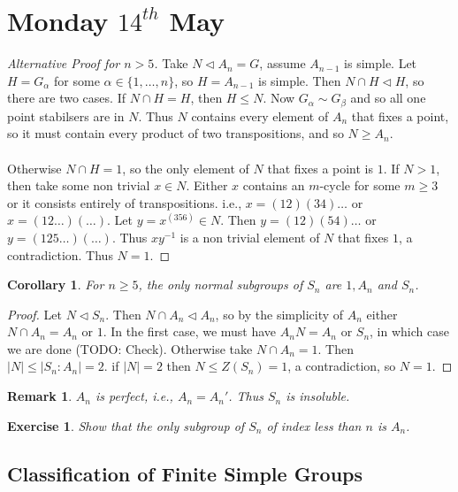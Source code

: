 \documentclass[a4paper,10pt]{article}
\newtheorem{Cor}[thm]{Corollary}
\newtheorem{Ex}[thm]{Exercise}
\newtheorem{rem}[thm]{Remark}
\begin{document}
\newpage
\section{Monday $14^{th}$ May}


\begin{proof}[Alternative Proof for $n > 5$]
Take $N \triangleleft A_n = G$, assume $A_{n-1}$ is simple. Let $H = G_\alpha$ for some $\alpha \in \{1, \dots, n\}$, so $H = A_{n-1}$ is simple. Then $N \cap H \triangleleft H$, so there are two cases. If $N \cap H = H$, then $H \leq N$. Now $G_\alpha \sim G_\beta$ and so all one point stabilsers are in $N$. Thus $N$ contains every element of $A_n$ that fixes a point, so it must contain every product of two transpositions, and so $N \geq A_n$. \\
\\
Otherwise $N \cap H = 1$, so the only element of $N$ that fixes a point is $1$. If $N > 1$, then take some non trivial $x \in N$. Either $x$ contains an $m$-cycle for some $m \geq 3$ or it consists entirely of transpositions. i.e., $x = (12)(34)\dots$ or $x = (12\dots)(\dots)$. Let $y = x^{(356)} \in N$. Then $y = (12)(54)\dots$ or $y = (125\dots)(\dots)$. Thus $xy^{-1}$ is a non trivial element of $N$ that fixes $1$, a contradiction. Thus $N  = 1$. 
\end{proof}



\begin{Cor}
For $n \geq 5$, the only normal subgroups of $S_n$ are $1, A_n$ and $S_n$. 
\end{Cor}
\begin{proof}
Let $N \triangleleft S_n$. Then $N \cap A_n \triangleleft A_n$, so by the simplicity of $A_n$ either $N \cap A_n = A_n$ or $1$. In the first case, we must have $A_n N = A_n$ or $S_n$, in which case we are done (TODO: Check). Otherwise take $N \cap A_n = 1$. Then $|N| \leq |S_n : A_n| = 2$. if $|N| = 2$ then $N \leq Z(S_n) = 1$, a contradiction, so $N = 1$. 
\end{proof}


\begin{rem}
$A_n$ is perfect, i.e., $A_n = A_n'$. Thus $S_n$ is insoluble.
\end{rem}

\begin{Ex}
Show that the only subgroup of $S_n$ of index less than $n$ is $A_n$.
\end{Ex}

\subsection{Classification of Finite Simple Groups}
\end{document}
